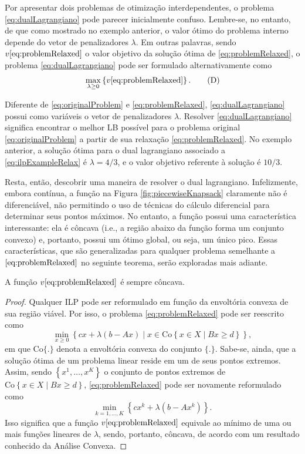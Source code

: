 {Por apresentar dois problemas de otimização interdependentes, o problema \eqref{eq:dualLagrangiano} pode parecer inicialmente confuso. Lembre-se, no entanto, de que como mostrado no exemplo anterior, o valor ótimo do problema interno depende do vetor de penalizadores $\lambda$. Em outras palavras, sendo $v\eqref{eq:problemRelaxed}$ o valor objetivo da solução ótima de \eqref{eq:problemRelaxed}, o problema \eqref{eq:dualLagrangiano} pode ser formulado alternativamente como \begin{align*}
	\max_{\lambda \geq 0} \left\{ v\eqref{eq:problemRelaxed} \right\}. \tag{D}
\end{align*}

Diferente de \eqref{eq:originalProblem} e \eqref{eq:problemRelaxed}, \eqref{eq:dualLagrangiano} possui como variáveis o vetor de penalizadores $\lambda$. Resolver \eqref{eq:dualLagrangiano} significa encontrar o melhor LB possível para o problema original \eqref{eq:originalProblem} a partir de sua relaxação \eqref{eq:problemRelaxed}. No exemplo anterior, a solução ótima para o dual lagrangiano associado a \eqref{eq:ilpExampleRelax} é $\lambda=4/3$, e o valor objetivo referente à solução é $10/3$.

Resta, então, descobrir uma maneira de resolver o dual lagrangiano. Infelizmente, embora contínua, a função na Figura \ref{fig:piecewiseKnapsack} claramente não é diferenciável, não permitindo o uso de técnicas do cálculo diferencial para determinar seus pontos máximos. No entanto, a função possui uma característica interessante: ela é côncava (i.e., a região abaixo da função forma um conjunto convexo) e, portanto, possui um ótimo global, ou seja, um único pico. Essas características, que são generalizadas para qualquer problema semelhante a $\eqref{eq:problemRelaxed}$ no seguinte teorema, serão exploradas mais adiante.

\begin{theorem}
	\label{thm:lagrangianDualConcavity}
	A função $v\eqref{eq:problemRelaxed}$ é sempre côncava.
\end{theorem}
\begin{proof}
	Qualquer ILP pode ser reformulado em função da envoltória convexa de sua região viável. Por isso, o problema \eqref{eq:problemRelaxed} pode ser reescrito como  \[ \min_{x \geq 0} \left\{ cx + \lambda (b - Ax) \mid x \in \text{Co} \left\{ x \in X \mid Bx \geq d  \right\} \right\}, \] em que $\text{Co}\{ . \}$ denota a envoltória convexa do conjunto $\{.\}$. Sabe-se, ainda, que a solução ótima de um problema linear reside em um de seus pontos extremos. Assim, sendo \(\left\{ x^1, \dots, x^K  \right\}\) o conjunto de pontos extremos de \(\text{Co} \left\{ x \in X \mid Bx \geq d \right\}\), \eqref{eq:problemRelaxed} pode ser novamente reformulado como \[ \min_{k=1,\dots,K} \left\{ cx^k + \lambda (b - Ax^k)  \right\}. \]
Isso significa que a função $v\eqref{eq:problemRelaxed}$ equivale ao mínimo de uma ou mais funções lineares de $\lambda$, sendo, portanto, côncava, de acordo com um resultado conhecido da Análise Convexa.
\end{proof}

}
